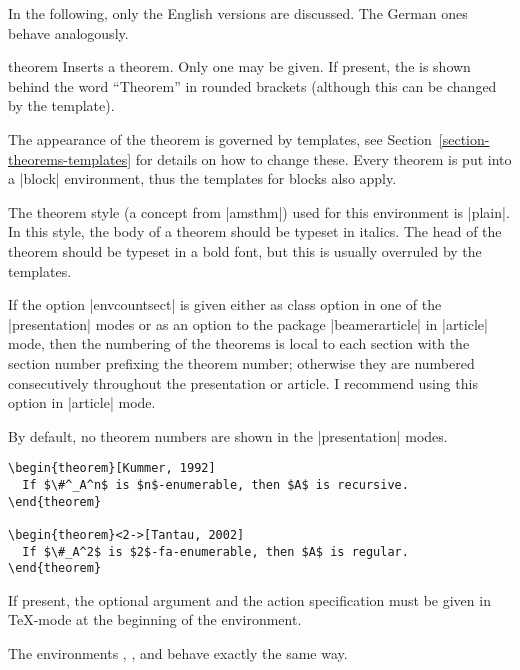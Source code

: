 In the following, only the English versions are discussed. The German
ones behave  analogously.

\begin{environment}{{theorem}}
  Inserts a theorem. Only one  may be
  given. If present, the  is shown behind the
  word ``Theorem'' in rounded brackets (although this can be changed by
  the template).

  The appearance of the theorem is governed by
  templates, see Section~\ref{section-theorems-templates} for details
  on how to change these. Every theorem is put into a |block|
  environment, thus the templates for blocks also apply.

  The theorem style (a concept from |amsthm|) used for this
  environment is |plain|. In this style, the body of a theorem should
  be typeset in italics. The head of the theorem should be typeset in
  a bold font, but this is usually overruled by the templates.

  If the option |envcountsect| is given either as class option in one
  of the |presentation| modes or as an option to the package
  |beamerarticle| in |article| mode, then the numbering of the
  theorems is local to each section with the section number prefixing
  the theorem number; otherwise they are numbered consecutively
  throughout the presentation or article. I recommend using this
  option in |article| mode.

  By default, no theorem numbers are shown in the |presentation| modes.

  \example
\begin{verbatim}
\begin{theorem}[Kummer, 1992]
  If $\#^_A^n$ is $n$-enumerable, then $A$ is recursive.
\end{theorem}

\begin{theorem}<2->[Tantau, 2002]
  If $\#_A^2$ is $2$-fa-enumerable, then $A$ is regular.
\end{theorem}
\end{verbatim}

  \lyxnote
  If present, the optional argument and the action specification must
  be given in \TeX-mode at the beginning of the environment.
\end{environment}

The environments , , and
 behave exactly the same way.

